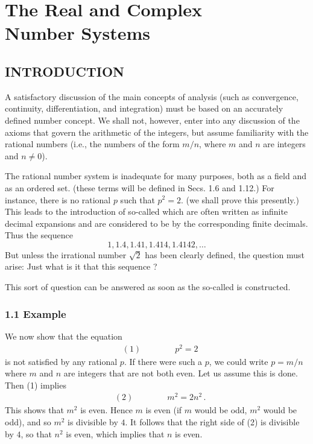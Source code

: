\setcounter{chapter}{0}
\renewcommand{\thechapter}{1}
\chapter{The Real and Complex\\ Number Systems}\label{ch:1}
\setcounter{equation}{0}	        %

\section*{INTRODUCTION}\label{sec:1.1}

A satisfactory discussion of the main concepts of analysis (such as convergence, continuity, differentiation, and integration) must be based on an accurately defined number concept. We shall not, however, enter into any discussion of the axioms that govern the arithmetic of the integers, but assume familiarity with the rational numbers (i.e., the numbers of the form $m/n$, where $m$ and $n$ are integers and $n \neq 0$).

The rational number system is inadequate for many purposes, both as a field and as an ordered set. (these terms will be defined in Secs. 1.6 and 1.12.) For instance, there is no rational $p$ such that $p^2 = 2$. (we shall prove this presently.) This leads to the introduction of so-called  which are often written as infinite decimal expansions and are considered to be  by the corresponding finite decimals. Thus the sequence
$$1, 1.4, 1.41, 1.414, 1.4142, \ldots$$ 
 But unless the irrational number $\sqrt{2}$ has been clearly defined, the question must arise: Just what is it that this sequence ?

This sort of question can be answered as soon as the so-called  is constructed.
\subsection*{1.1 Example}
We now show that the equation
\begin{align*}
&(1) \quad\quad\quad\quad p^2 = 2
\end{align*}
is not satisfied by any rational $p$. If there were such a $p$, we could write $p = m/n$ where $m$ and $n$ are integers that are not both even. Let us assume this is done. Then (1) implies     
\begin{align*}
&(2) \quad\quad\quad\quad m^2 = 2n^2\,.
\end{align*}
This shows that $m^2$ is even. Hence $m$ is even (if $m$ would be odd, $m^2$ would be odd), and so $m^2$ is divisible by $4$. It follows that the right side of (2) is divisible by $4$, so that $n^2$ is even, which implies that $n$ is even.

